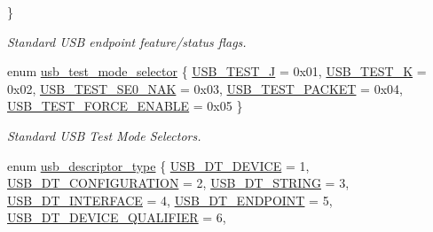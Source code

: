 \begin{DoxyCompactItemize}
 \}
\begin{DoxyCompactList}\small\item\em \-Standard \-U\-S\-B endpoint feature/status flags. \end{DoxyCompactList}\item 
enum \hyperlink{group__usb__protocol__group_gade3fc5b71e88ed167a8c8d67ee087db3}{usb\-\_\-test\-\_\-mode\-\_\-selector} \{ \*
\hyperlink{group__usb__protocol__group_ggade3fc5b71e88ed167a8c8d67ee087db3ad8a1b477f0fa871dbde208745635eb09}{\-U\-S\-B\-\_\-\-T\-E\-S\-T\-\_\-\-J} =  0x01, 
\hyperlink{group__usb__protocol__group_ggade3fc5b71e88ed167a8c8d67ee087db3adf91b3ec7a11997b124e2ecb2bcb3965}{\-U\-S\-B\-\_\-\-T\-E\-S\-T\-\_\-\-K} =  0x02, 
\hyperlink{group__usb__protocol__group_ggade3fc5b71e88ed167a8c8d67ee087db3a14e0870eb309e2408717e26febf54c5f}{\-U\-S\-B\-\_\-\-T\-E\-S\-T\-\_\-\-S\-E0\-\_\-\-N\-A\-K} =  0x03, 
\hyperlink{group__usb__protocol__group_ggade3fc5b71e88ed167a8c8d67ee087db3a11aadaaa6768ad9140a0ad6f8543d245}{\-U\-S\-B\-\_\-\-T\-E\-S\-T\-\_\-\-P\-A\-C\-K\-E\-T} =  0x04, 
\*
\hyperlink{group__usb__protocol__group_ggade3fc5b71e88ed167a8c8d67ee087db3ae6d07dd0dfbb61581ad6d548ab26904a}{\-U\-S\-B\-\_\-\-T\-E\-S\-T\-\_\-\-F\-O\-R\-C\-E\-\_\-\-E\-N\-A\-B\-L\-E} =  0x05
 \}
\begin{DoxyCompactList}\small\item\em \-Standard \-U\-S\-B \-Test \-Mode \-Selectors. \end{DoxyCompactList}\item 
enum \hyperlink{group__usb__protocol__group_ga87d46dd117d939964c939f1518dec93f}{usb\-\_\-descriptor\-\_\-type} \{ \*
\hyperlink{group__usb__protocol__group_gga87d46dd117d939964c939f1518dec93faf57d79677304d9cc81a1e08769259c56}{\-U\-S\-B\-\_\-\-D\-T\-\_\-\-D\-E\-V\-I\-C\-E} =  1, 
\hyperlink{group__usb__protocol__group_gga87d46dd117d939964c939f1518dec93fa30b73c8e214a98c686c6e97aabc3b3d7}{\-U\-S\-B\-\_\-\-D\-T\-\_\-\-C\-O\-N\-F\-I\-G\-U\-R\-A\-T\-I\-O\-N} =  2, 
\hyperlink{group__usb__protocol__group_gga87d46dd117d939964c939f1518dec93faa745915a1e9b09eba35fdd2d455d5100}{\-U\-S\-B\-\_\-\-D\-T\-\_\-\-S\-T\-R\-I\-N\-G} =  3, 
\hyperlink{group__usb__protocol__group_gga87d46dd117d939964c939f1518dec93fa5d95804e21ff8a4aba8f9806c5f35edc}{\-U\-S\-B\-\_\-\-D\-T\-\_\-\-I\-N\-T\-E\-R\-F\-A\-C\-E} =  4, 
\*
\hyperlink{group__usb__protocol__group_gga87d46dd117d939964c939f1518dec93fa2b4e1c2a152ef2c70fd494de1806e325}{\-U\-S\-B\-\_\-\-D\-T\-\_\-\-E\-N\-D\-P\-O\-I\-N\-T} =  5, 
\hyperlink{group__usb__protocol__group_gga87d46dd117d939964c939f1518dec93fab135351d3cd9a92a46b80fbb28d0f1b3}{\-U\-S\-B\-\_\-\-D\-T\-\_\-\-D\-E\-V\-I\-C\-E\-\_\-\-Q\-U\-A\-L\-I\-F\-I\-E\-R} =  6, 

\end{DoxyCompactItemize}
